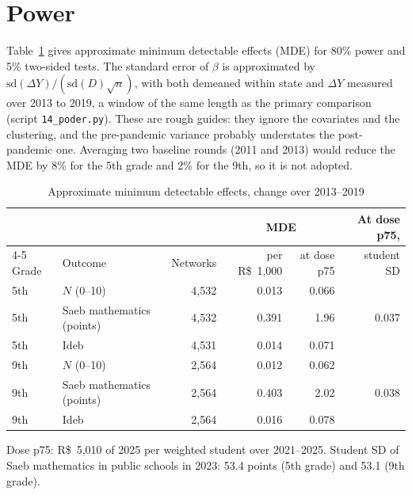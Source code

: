 \documentclass[11pt]{article}
\newcommand{\reais}{R\$}
\begin{document}
\section{Power}\label{sec:poder}

Table~\ref{tab:mde} gives approximate minimum detectable effects (MDE) for 80\% power and 5\% two-sided tests. The standard error of $\beta$ is approximated by $\text{sd}(\Delta Y)/(\text{sd}(D)\sqrt{n})$, with both demeaned within state and $\Delta Y$ measured over 2013 to 2019, a window of the same length as the primary comparison (script \texttt{14\_poder.py}). These are rough guides: they ignore the covariates and the clustering, and the pre-pandemic variance probably understates the post-pandemic one. Averaging two baseline rounds (2011 and 2013) would reduce the MDE by 8\% for the 5th grade and 2\% for the 9th, so it is not adopted.

\begin{table}[h]
\centering
\caption{Approximate minimum detectable effects, change over 2013--2019}\label{tab:mde}
\small
\begin{tabular}{llrrrr}
\toprule
 & & & \multicolumn{2}{c}{MDE} & At dose p75, \\
\cmidrule(lr){4-5}
Grade & Outcome & Networks & per \reais{}~1,000 & at dose p75 & student SD \\
\midrule
5th & $N$ (0--10) & 4,532 & 0.013 & 0.066 & \\
5th & Saeb mathematics (points) & 4,532 & 0.391 & 1.96 & 0.037 \\
5th & Ideb & 4,531 & 0.014 & 0.071 & \\
9th & $N$ (0--10) & 2,564 & 0.012 & 0.062 & \\
9th & Saeb mathematics (points) & 2,564 & 0.403 & 2.02 & 0.038 \\
9th & Ideb & 2,564 & 0.016 & 0.078 & \\
\bottomrule
\end{tabular}

\smallskip
\footnotesize Dose p75: \reais{}~5,010 of 2025 per weighted student over 2021--2025. Student SD of Saeb mathematics in public schools in 2023: 53.4 points (5th grade) and 53.1 (9th grade).
\end{table}
\end{document}
